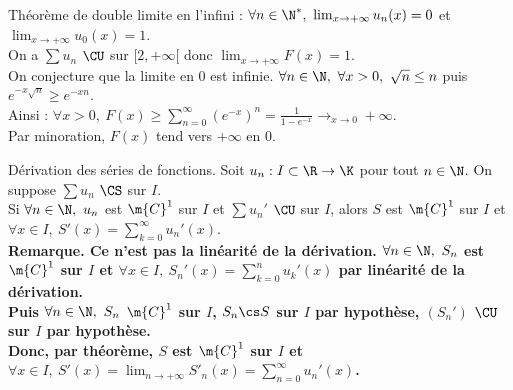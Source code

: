 \documentclass[11pt]{article}
\begin{document}
\begin{ex}{}{}
    Théorème de double limite en l'infini : $\forall n \in \N^*, ~ \lim_{x\to+\infty}u_n(x)=0$ et $\lim_{x\to+\infty}u_0(x)=1$.\\
    On a $\sum u_n$ $\CU$ sur $[2,+\infty[$ donc $\lim_{x\to+\infty}F(x)=1$.\\
    On conjecture que la limite en 0 est infinie. $\forall n \in \N, ~ \forall x > 0, ~ \sqrt{n}\leq n$ puis $e^{-x\sqrt{n}}\geq e^{-xn}$.\\
    Ainsi : $\forall x > 0, ~ F(x) \geq \sum_{n=0}^{\infty}(e^{-x})^n=\frac{1}{1-e^{-x}}\to_{x\to0}+\infty$.\\
    Par minoration, $F(x)$ tend vers $+\infty$ en $0$. 
\end{ex}

\begin{thm}{Dérivation des séries de fonctions.}{}
    Soit $u_n:I\subset\R\to\K$ pour tout $n\in\N$. On suppose $\sum u_n$ $\CS$ sur $I$.\\
    Si $\forall n \in \N, ~ u_n$ est $\m{C}^1$ sur $I$ et $\sum u_n'$ $\CU$ sur $I$, alors $S$ est $\m{C}^1$ sur $I$ et $\forall x \in I, ~ S'(x)=\sum^{\infty}_{k=0} u_n'(x)$.\\
    \bf{Remarque.} Ce n'est pas la linéarité de la dérivation.
    \tcblower
    $\forall n \in \N, ~ S_n$ est $\m{C}^1$ sur $I$ et $\forall x \in I, ~ S_n'(x)=\sum_{k=0}^n u_k'(x)$ par linéarité de la dérivation.\\
    Puis $\forall n \in \N, ~ S_n$ $\m{C}^1$ sur $I$, $S_n\cs S$ sur $I$ par hypothèse, $(S_n')$ $\CU$ sur $I$ par hypothèse.\\
    Donc, par théorème, $S$ est $\m{C}^1$ sur $I$ et $\forall x \in I, ~ S'(x)=\lim_{n\to+\infty}S'_n(x)=\sum_{n=0}^{\infty}u_n'(x)$.
\end{thm}
\end{document}
